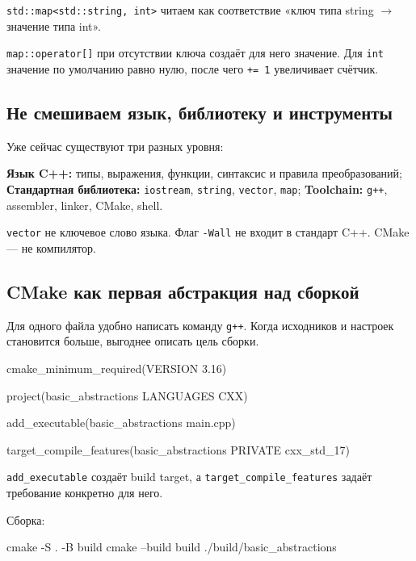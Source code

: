 \texttt{std::map<std::string, int>} читаем как соответствие
«ключ типа string $\rightarrow$ значение типа int».

\begin{whybox}
\texttt{map::operator[]} при отсутствии ключа создаёт для него значение.
Для \texttt{int} значение по умолчанию равно нулю, после чего
\texttt{+= 1} увеличивает счётчик.
\end{whybox}

\subsection{Не смешиваем язык, библиотеку и инструменты}

Уже сейчас существуют три разных уровня:

\textbf{Язык C++:} типы, выражения, функции, синтаксис и правила преобразований; \textbf{Стандартная библиотека:} \texttt{iostream}, \texttt{string}, \texttt{vector}, \texttt{map}; \textbf{Toolchain:} \texttt{g++}, assembler, linker, CMake, shell.

\texttt{vector} не ключевое слово языка.
Флаг \texttt{-Wall} не входит в стандарт C++.
CMake --- не компилятор.

\subsection{CMake как первая абстракция над сборкой}

Для одного файла удобно написать команду \texttt{g++}. Когда исходников и
настроек становится больше, выгоднее описать цель сборки.

\begin{cmakecode}
cmake_minimum_required(VERSION 3.16)

project(basic_abstractions LANGUAGES CXX)

add_executable(basic_abstractions main.cpp)

target_compile_features(basic_abstractions PRIVATE cxx_std_17)
\end{cmakecode}

\texttt{add\_executable} создаёт build target, а
\texttt{target\_compile\_features} задаёт требование конкретно для него.

Сборка:

\begin{shellcode}
cmake -S . -B build
cmake --build build
./build/basic_abstractions
\end{shellcode}

